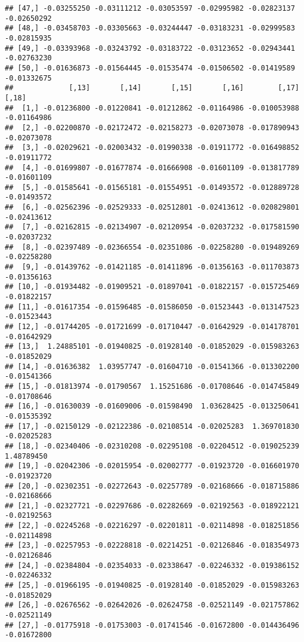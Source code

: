 \documentclass[
]{article}
\begin{document}
\begin{verbatim}
## [47,] -0.03255250 -0.03111212 -0.03053597 -0.02995982 -0.02823137 -0.02650292
## [48,] -0.03458703 -0.03305663 -0.03244447 -0.03183231 -0.02999583 -0.02815935
## [49,] -0.03393968 -0.03243792 -0.03183722 -0.03123652 -0.02943441 -0.02763230
## [50,] -0.01636873 -0.01564445 -0.01535474 -0.01506502 -0.01419589 -0.01332675
##             [,13]       [,14]       [,15]       [,16]        [,17]       [,18]
##  [1,] -0.01236800 -0.01220841 -0.01212862 -0.01164986 -0.010053988 -0.01164986
##  [2,] -0.02200870 -0.02172472 -0.02158273 -0.02073078 -0.017890943 -0.02073078
##  [3,] -0.02029621 -0.02003432 -0.01990338 -0.01911772 -0.016498852 -0.01911772
##  [4,] -0.01699807 -0.01677874 -0.01666908 -0.01601109 -0.013817789 -0.01601109
##  [5,] -0.01585641 -0.01565181 -0.01554951 -0.01493572 -0.012889728 -0.01493572
##  [6,] -0.02562396 -0.02529333 -0.02512801 -0.02413612 -0.020829801 -0.02413612
##  [7,] -0.02162815 -0.02134907 -0.02120954 -0.02037232 -0.017581590 -0.02037232
##  [8,] -0.02397489 -0.02366554 -0.02351086 -0.02258280 -0.019489269 -0.02258280
##  [9,] -0.01439762 -0.01421185 -0.01411896 -0.01356163 -0.011703873 -0.01356163
## [10,] -0.01934482 -0.01909521 -0.01897041 -0.01822157 -0.015725469 -0.01822157
## [11,] -0.01617354 -0.01596485 -0.01586050 -0.01523443 -0.013147523 -0.01523443
## [12,] -0.01744205 -0.01721699 -0.01710447 -0.01642929 -0.014178701 -0.01642929
## [13,]  1.24885101 -0.01940825 -0.01928140 -0.01852029 -0.015983263 -0.01852029
## [14,] -0.01636382  1.03957747 -0.01604710 -0.01541366 -0.013302200 -0.01541366
## [15,] -0.01813974 -0.01790567  1.15251686 -0.01708646 -0.014745849 -0.01708646
## [16,] -0.01630039 -0.01609006 -0.01598490  1.03628425 -0.013250641 -0.01535392
## [17,] -0.02150129 -0.02122386 -0.02108514 -0.02025283  1.369701830 -0.02025283
## [18,] -0.02340406 -0.02310208 -0.02295108 -0.02204512 -0.019025239  1.48789450
## [19,] -0.02042306 -0.02015954 -0.02002777 -0.01923720 -0.016601970 -0.01923720
## [20,] -0.02302351 -0.02272643 -0.02257789 -0.02168666 -0.018715886 -0.02168666
## [21,] -0.02327721 -0.02297686 -0.02282669 -0.02192563 -0.018922121 -0.02192563
## [22,] -0.02245268 -0.02216297 -0.02201811 -0.02114898 -0.018251856 -0.02114898
## [23,] -0.02257953 -0.02228818 -0.02214251 -0.02126846 -0.018354973 -0.02126846
## [24,] -0.02384804 -0.02354033 -0.02338647 -0.02246332 -0.019386152 -0.02246332
## [25,] -0.01966195 -0.01940825 -0.01928140 -0.01852029 -0.015983263 -0.01852029
## [26,] -0.02676562 -0.02642026 -0.02624758 -0.02521149 -0.021757862 -0.02521149
## [27,] -0.01775918 -0.01753003 -0.01741546 -0.01672800 -0.014436496 -0.01672800

\end{verbatim}
\end{document}
